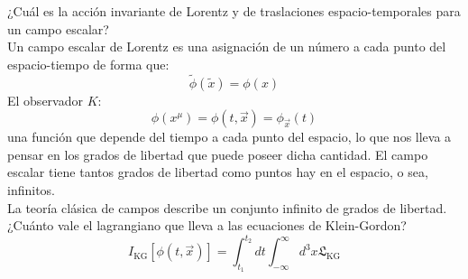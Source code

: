 \documentclass[../main.tex]{subfiles}
\begin{document}
¿Cuál es la acción invariante de Lorentz y de traslaciones espacio-temporales para un campo escalar? \\
Un campo escalar de Lorentz es una asignación de un número a cada punto del espacio-tiempo de forma que:
\begin{equation*}
  \tilde{\phi} (\tilde{x}) = \phi(x)
\end{equation*}
El observador $K$:
\begin{equation*}
  \phi(x^\mu) = \phi(t,\vec{x}) = \phi_{\vec{x}}(t)
\end{equation*}
una función que depende del tiempo a cada punto del espacio, lo que nos lleva a pensar en los grados de libertad que puede poseer dicha cantidad. El campo escalar tiene tantos grados de libertad como puntos hay en el espacio, o sea, infinitos. \\

La teoría clásica de campos describe un conjunto infinito de grados de libertad. ¿Cuánto vale el lagrangiano que lleva a las ecuaciones de Klein-Gordon?
\begin{equation}
  I_{\text{KG}}[\phi(t,\vec{x})] = \int_{t_1}^{t_2} dt \int_{-\infty}^{\infty} d^3 x  \mathfrak{L}_{\text{KG}}  %
\end{equation}
\end{document}
